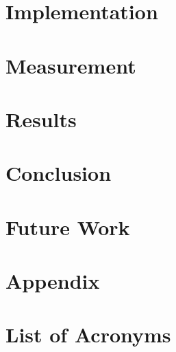 \documentclass[a4paper,11pt,abstracton,twoside,titlepage,openany,nochapterprefix,noappendixprefix,liststotoc,bibtotoc,normalheadings,pointlessnumbers,BCOR1cm]{article}
\begin{document}
\section{Implementation}

\newpage

\section{Measurement}

\newpage

\section{Results}

\newpage

\section{Conclusion}

\newpage

\section{Future Work}

\newpage

\section{Appendix}

\newpage

\section{List of Acronyms}


\newpage


\newpage

\newpage
\mbox{}
\cleardoublepage
\end{document}
